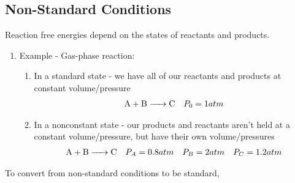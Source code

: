 \documentclass{article}  %
\begin{document}
\subsection*{Non-Standard Conditions}
Reaction free energies depend on the states of reactants and products.
\begin{enumerate}
    \item Example - Gas-phase reaction:
        \begin{enumerate}
            \item In a standard state - we have all of our reactants and products at constant volume/pressure
            \begin{equation*}
                \begin{aligned}
                    \ce{A + B -> C} \quad P_0 = 1atm 
                \end{aligned}
            \end{equation*}
            \item  In a nonconstant state - our products and reactants aren't held at a constant volume/pressure, but have their own volume/pressures
                \begin{equation*}
                    \begin{aligned}
                        \ce{A + B -> C} \quad P_A = 0.8atm \quad P_B = 2atm \quad P_C = 1.2atm
                    \end{aligned}
                \end{equation*}
        \end{enumerate}
\end{enumerate}
To convert from non-standard conditions to be standard,
\end{document}
